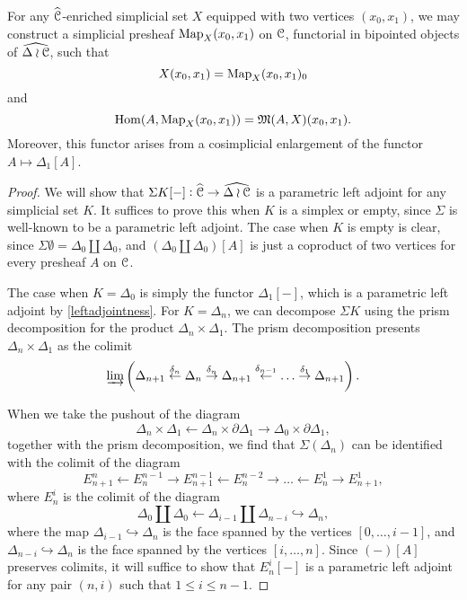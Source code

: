 \begin{lemma}For any \(\widehat{\mathcal{C}}\)-enriched simplicial set \(X\) equipped with two vertices \((x_0,x_1)\), we may construct a simplicial presheaf \(\operatorname{Map}_X(x_0,x_1)\) on \(\mathcal{C}\), functorial in bipointed objects of \(\widehat{\Delta\wr\mathcal{C}}\), such that \[X(x_0,x_1)=\operatorname{Map}_X(x_0,x_1)_0\] and \[{\operatorname{Hom}}(A,\operatorname{Map}_X(x_0,x_1))=\mathfrak{M}(A,X)(x_0,x_1).\]  Moreover, this functor arises from a cosimplicial enlargement of the functor \(A\mapsto \Delta_1[A]\).
\end{lemma}
\begin{proof}
We will show that \(\Sigma K [-]:\widehat{\mathcal{C}}\to \widehat{\Delta\wr \mathcal{C}}\) is a parametric left adjoint for any simplicial set \(K\).  It suffices to prove this when \(K\) is a simplex or empty, since \(\Sigma\) is well-known to be a parametric left adjoint.  The case when \(K\) is empty is clear, since \(\Sigma\emptyset=\Delta_0 \coprod \Delta_0\), and \((\Delta_0\coprod \Delta_0)[A]\) is just a coproduct of two vertices for every presheaf \(A\) on \(\mathcal{C}\).  

The case when \(K=\Delta_0\) is simply the functor \(\Delta_1[-]\), which is a parametric left adjoint by \eqref{leftadjointness}.  For \(K=\Delta_n\), we can decompose \(\Sigma K\) using the prism decomposition for the product \(\Delta_n\times \Delta_1\).  The prism decomposition presents \(\Delta_n\times \Delta_1\) as the colimit 
\[\varinjlim\left (\Delta_{n+1} \overset{\delta_n}{\leftarrow} \Delta_n \overset{\delta_n}{\rightarrow} \Delta_{n+1} \overset{\delta_{n-1}}{\leftarrow} \dots \overset{\delta_1}{\rightarrow} \Delta_{n+1}\right ). \]

When we take the pushout of the diagram \[\Delta_n\times \Delta_1 \leftarrow \Delta_n \times \partial \Delta_1\to \Delta_0 \times \partial \Delta_1,\] together with the prism decomposition, we find that \(\Sigma(\Delta_n)\) can be identified with the colimit of the diagram 
\[E_{n+1}^{n} \leftarrow E_{n}^{n-1} \rightarrow E_{n+1}^{n-1} \leftarrow E_n^{n-2} \to \dots \leftarrow E_n^1 \to E_{n+1}^1,\]
where \(E_n^i\) is the colimit of the diagram \[\Delta_0 \coprod \Delta_0 \leftarrow \Delta_{i-1} \coprod \Delta_{n-i} \hookrightarrow \Delta_n, \] where the map \(\Delta_{i-1}\hookrightarrow \Delta_n\) is the face spanned by the vertices \([0,\dots, i-1]\), and \(\Delta_{n-i}\hookrightarrow \Delta_n\) is the face spanned by the vertices \( [i,\dots,n]\).  Since \((-)[A]\) preserves colimits, it will suffice to show that \(E_n^i[-]\) is a parametric left adjoint for any pair \((n,i)\) such that \(1\leq i \leq n-1\).  


\end{proof}
